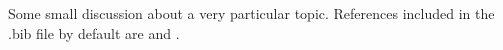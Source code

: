 \documentclass[12pt]{amsart}
\begin{document}
\maketitle

Some small discussion about a very particular topic.
References included in the .bib file by default are \cite{har77} and \cite{stacks}.

\newpage


\vfill
\end{document}
